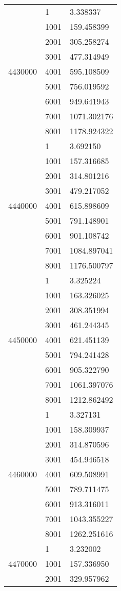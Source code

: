 \begin{table}[htb!]
\begin{tabular}{lll}
\multirow[c]{9}{*}{4430000} & 1 & 3.338337 \\
 & 1001 & 159.458399 \\
 & 2001 & 305.258274 \\
 & 3001 & 477.314949 \\
 & 4001 & 595.108509 \\
 & 5001 & 756.019592 \\
 & 6001 & 949.641943 \\
 & 7001 & 1071.302176 \\
 & 8001 & 1178.924322 \\
\multirow[c]{9}{*}{4440000} & 1 & 3.692150 \\
 & 1001 & 157.316685 \\
 & 2001 & 314.801216 \\
 & 3001 & 479.217052 \\
 & 4001 & 615.898609 \\
 & 5001 & 791.148901 \\
 & 6001 & 901.108742 \\
 & 7001 & 1084.897041 \\
 & 8001 & 1176.500797 \\
\multirow[c]{9}{*}{4450000} & 1 & 3.325224 \\
 & 1001 & 163.326025 \\
 & 2001 & 308.351994 \\
 & 3001 & 461.244345 \\
 & 4001 & 621.451139 \\
 & 5001 & 794.241428 \\
 & 6001 & 905.322790 \\
 & 7001 & 1061.397076 \\
 & 8001 & 1212.862492 \\
\multirow[c]{9}{*}{4460000} & 1 & 3.327131 \\
 & 1001 & 158.309937 \\
 & 2001 & 314.870596 \\
 & 3001 & 454.946518 \\
 & 4001 & 609.508991 \\
 & 5001 & 789.711475 \\
 & 6001 & 913.316011 \\
 & 7001 & 1043.355227 \\
 & 8001 & 1262.251616 \\
\multirow[c]{9}{*}{4470000} & 1 & 3.232002 \\
 & 1001 & 157.336950 \\
 & 2001 & 329.957962 \\

\end{tabular}
\end{table}
